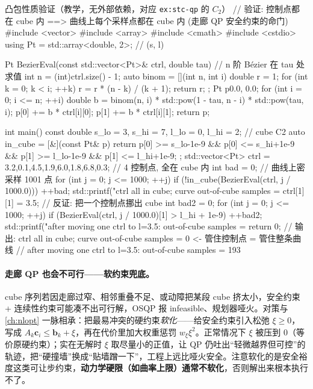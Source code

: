 \begin{codebox}[C++]{凸包性质验证（教学，无外部依赖，对应 \texttt{ex:stc-qp} 的 $C_2$）}
// 验证: 控制点都在 cube 内 ==> 曲线上每个采样点都在 cube 内 (走廊 QP 安全约束的命门)
#include <vector>
#include <array>
#include <cmath>
#include <cstdio>
using Pt = std::array<double, 2>;                     // (s, l)

Pt BezierEval(const std::vector<Pt>& ctrl, double tau) {   // n 阶 Bézier 在 tau 处求值
  int n = (int)ctrl.size() - 1;
  auto binom = [](int n, int i) {
    double r = 1; for (int k = 0; k < i; ++k) r = r * (n - k) / (k + 1); return r; };
  Pt p{0.0, 0.0};
  for (int i = 0; i <= n; ++i) {
    double b = binom(n, i) * std::pow(1 - tau, n - i) * std::pow(tau, i);
    p[0] += b * ctrl[i][0]; p[1] += b * ctrl[i][1];
  }
  return p;
}

int main() {
  const double s_lo = 3, s_hi = 7, l_lo = 0, l_hi = 2;     // cube C2
  auto in_cube = [&](const Pt& p) {
    return p[0] >= s_lo-1e-9 && p[0] <= s_hi+1e-9 && p[1] >= l_lo-1e-9 && p[1] <= l_hi+1e-9; };
  std::vector<Pt> ctrl = {{3.2,0.1},{4.5,1.9},{6.0,1.8},{6.8,0.3}};  // 4 控制点, 全在 cube 内
  int bad = 0;                                             // 曲线上密采样 1001 点
  for (int j = 0; j <= 1000; ++j)
    if (!in_cube(BezierEval(ctrl, j / 1000.0))) ++bad;
  std::printf("ctrl all in cube; curve out-of-cube samples = %
  ctrl[1][1] = 3.5;                                        // 反证: 把一个控制点挪出 cube
  int bad2 = 0;
  for (int j = 0; j <= 1000; ++j)
    if (BezierEval(ctrl, j / 1000.0)[1] > l_hi + 1e-9) ++bad2;
  std::printf("after moving one ctrl to l=3.5: out-of-cube samples = %
  return 0;
}
// 输出: ctrl all in cube; curve out-of-cube samples = 0     <- 管住控制点 = 管住整条曲线
//       after moving one ctrl to l=3.5: out-of-cube samples = 193
\end{codebox}

\paragraph{走廊 QP 也会不可行——软约束兜底。}
cube 序列若因走廊过窄、相邻重叠不足、或动障把某段 cube 挤太小，安全约束 + 连续性约束可能凑不出可行解，OSQP 报 infeasible、规划器哑火。对策与 \cref{ch:nlopt} 一脉相承：把最易冲突的硬约束\emph{软化}——给安全约束引入松弛 $\xi\ge0$，写成 $A_k\mathbf{c}_i\le\mathbf{b}_k+\xi$，再在代价里加大权重惩罚 $w_\xi\xi^2$。正常情况下 $\xi$ 被压到 $0$（等价原硬约束）；实在无解时 $\xi$ 取尽量小的正值，让 QP 仍吐出“轻微越界但可控”的轨迹，把“硬撞墙”换成“贴墙蹭一下”，工程上远比哑火安全。注意软化的是安全裕度这类可让步约束，\textbf{动力学硬限（如曲率上限）通常不软化}，否则解出来根本执行不了。


